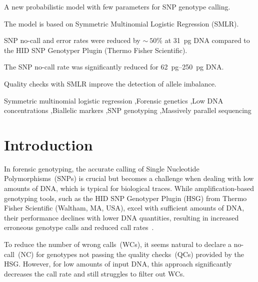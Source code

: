 \documentclass[preprint,5p,times,11pt]{elsarticle}
\begin{document}
\begin{frontmatter}
\onecolumn
\begin{highlights}
\item A new probabilistic model with few parameters for SNP genotype calling.
\item The model is based on Symmetric Multinomial Logistic Regression (SMLR).
\item SNP no-call and error rates were reduced by $\sim\!\!\!\:50\%$ at \SI{31}{\pg} DNA compared to the HID SNP Genotyper Plugin (Thermo Fisher Scientific).
\item The SNP no-call rate was significantly reduced for \SIrange[range-units = single, range-phrase = --]{62}{250}{\pg} DNA.
\item Quality checks with SMLR improve the detection of allele imbalance.
\end{highlights}

\begin{keyword}
Symmetric multinomial logistic regression \sep Forensic genetics \sep Low DNA concentrations \sep Biallelic markers \sep SNP genotyping \sep Massively parallel sequencing


\end{keyword}
\end{frontmatter}


\section{Introduction}
In forensic genotyping, the accurate calling of Single Nucleotide Polymorphisms~(SNPs) is crucial but becomes a challenge when dealing with low amounts of DNA, which is typical for biological traces.
While amplification-based genotyping tools, such as the HID SNP Genotyper Plugin (HSG) from Thermo Fisher Scientific (Waltham, MA, USA), excel with sufficient amounts of DNA, their performance declines with lower DNA quantities, resulting in increased erroneous genotype calls and reduced call rates~\cite{alasfi, mostad, butler, swgdam}.

To reduce the number of wrong calls~(WCs), it seems natural to declare a no-call~(NC) for genotypes not passing the quality checks~(QCs) provided by the HSG.
However, for low amounts of input DNA, this approach significantly decreases the call rate and still struggles to filter out WCs.
\end{document}
